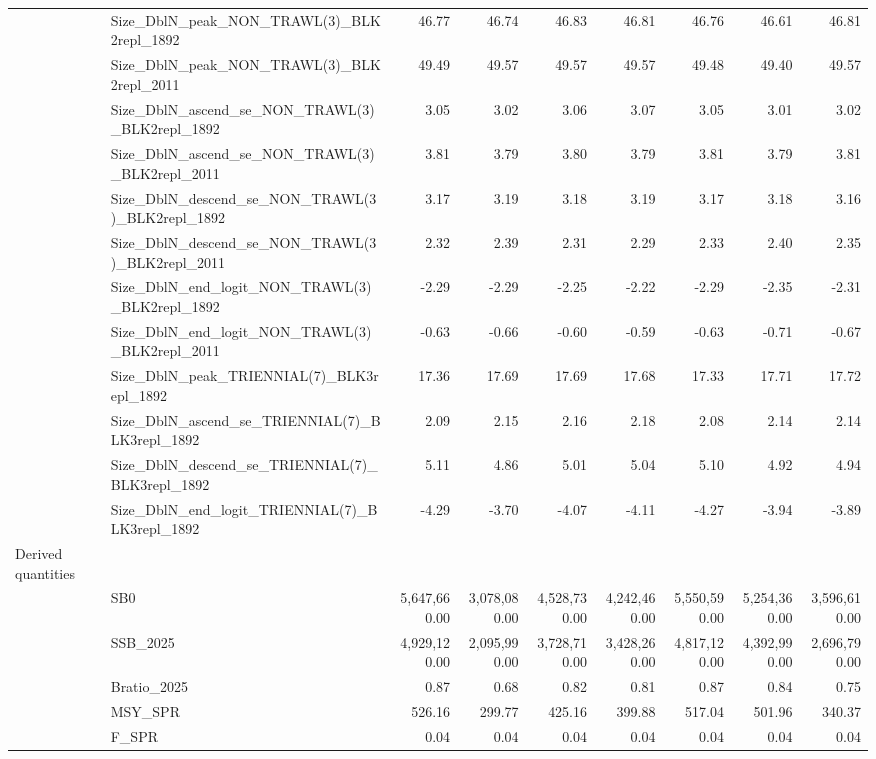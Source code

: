 \documentclass[
]{scrartcl}
\begin{document}
\begin{landscape}
\begin{longtable}{llrrrrrrr}
 & Size\_DblN\_peak\_NON\_TRAWL(3)\_BLK2repl\_1892 & 46.77 & 46.74 & 46.83 & 46.81 & 46.76 & 46.61 & 46.81 \\ 
 & Size\_DblN\_peak\_NON\_TRAWL(3)\_BLK2repl\_2011 & 49.49 & 49.57 & 49.57 & 49.57 & 49.48 & 49.40 & 49.57 \\ 
 & Size\_DblN\_ascend\_se\_NON\_TRAWL(3)\_BLK2repl\_1892 & 3.05 & 3.02 & 3.06 & 3.07 & 3.05 & 3.01 & 3.02 \\ 
 & Size\_DblN\_ascend\_se\_NON\_TRAWL(3)\_BLK2repl\_2011 & 3.81 & 3.79 & 3.80 & 3.79 & 3.81 & 3.79 & 3.81 \\ 
 & Size\_DblN\_descend\_se\_NON\_TRAWL(3)\_BLK2repl\_1892 & 3.17 & 3.19 & 3.18 & 3.19 & 3.17 & 3.18 & 3.16 \\ 
 & Size\_DblN\_descend\_se\_NON\_TRAWL(3)\_BLK2repl\_2011 & 2.32 & 2.39 & 2.31 & 2.29 & 2.33 & 2.40 & 2.35 \\ 
 & Size\_DblN\_end\_logit\_NON\_TRAWL(3)\_BLK2repl\_1892 & -2.29 & -2.29 & -2.25 & -2.22 & -2.29 & -2.35 & -2.31 \\ 
 & Size\_DblN\_end\_logit\_NON\_TRAWL(3)\_BLK2repl\_2011 & -0.63 & -0.66 & -0.60 & -0.59 & -0.63 & -0.71 & -0.67 \\ 
 & Size\_DblN\_peak\_TRIENNIAL(7)\_BLK3repl\_1892 & 17.36 & 17.69 & 17.69 & 17.68 & 17.33 & 17.71 & 17.72 \\ 
 & Size\_DblN\_ascend\_se\_TRIENNIAL(7)\_BLK3repl\_1892 & 2.09 & 2.15 & 2.16 & 2.18 & 2.08 & 2.14 & 2.14 \\ 
 & Size\_DblN\_descend\_se\_TRIENNIAL(7)\_BLK3repl\_1892 & 5.11 & 4.86 & 5.01 & 5.04 & 5.10 & 4.92 & 4.94 \\ 
 & Size\_DblN\_end\_logit\_TRIENNIAL(7)\_BLK3repl\_1892 & -4.29 & -3.70 & -4.07 & -4.11 & -4.27 & -3.94 & -3.89 \\ 
Derived quantities &  &  &  &  &  &  &  &  \\ 
 & SB0 & 5,647,660.00 & 3,078,080.00 & 4,528,730.00 & 4,242,460.00 & 5,550,590.00 & 5,254,360.00 & 3,596,610.00 \\ 
 & SSB\_2025 & 4,929,120.00 & 2,095,990.00 & 3,728,710.00 & 3,428,260.00 & 4,817,120.00 & 4,392,990.00 & 2,696,790.00 \\ 
 & Bratio\_2025 & 0.87 & 0.68 & 0.82 & 0.81 & 0.87 & 0.84 & 0.75 \\ 
 & MSY\_SPR & 526.16 & 299.77 & 425.16 & 399.88 & 517.04 & 501.96 & 340.37 \\ 
 & F\_SPR & 0.04 & 0.04 & 0.04 & 0.04 & 0.04 & 0.04 & 0.04 \\ 
\bottomrule

\end{longtable}

\endgroup

\end{landscape}
\end{document}

